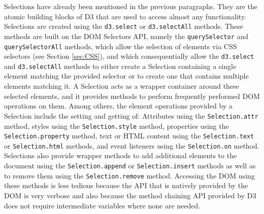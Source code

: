 Selections have already been mentioned in the previous paragraphs. They are the atomic building blocks of D3 that are used to access almost any functionality. Selections are created using the \lstinline{d3.select} or \lstinline{d3.selectAll} methods. These methods are built on the DOM Selectors API, namely the \lstinline{querySelector} and \lstinline{querySelectorAll} methods, which allow the selection of elements via CSS selectors (see Section \ref{sec:CSS}), and which consequentially allow the \lstinline{d3.select} and \lstinline{d3.selectAll} methods to either create a Selection containing a single element matching the provided selector or to create one that contains multiple elements matching it. A Selection acts as a wrapper container around these selected elements, and it provides methods to perform frequently performed DOM operations on them. Among others, the element operations provided by a Selection include the setting and getting of: Attributes using the \lstinline{Selection.attr} method, styles using the \lstinline{Selection.style} method, properties using the \lstinline{Selection.property} method, text or HTML content using the \lstinline{Selection.text} or \lstinline{Selection.html} methods, and event listeners using the \lstinline{Selection.on} method. Selections also provide wrapper methods to add additional elements to the document using the \lstinline{Selection.append} or \lstinline{Selection.insert} methods as well as to remove them using the \lstinline{Selection.remove} method. Accessing the DOM using these methods is less tedious because the API that is natively provided by the DOM is very verbose and also because the method chaining API provided by D3 does not require intermediate variables where none are needed.

